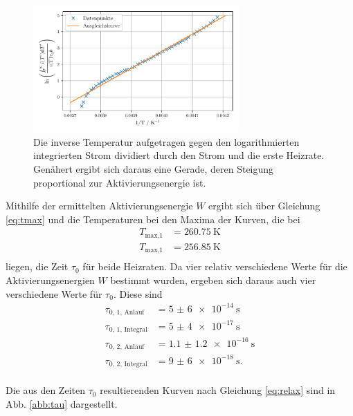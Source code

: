 \begin{figure}
    \centering
    \includegraphics[width=0.7\textwidth]{figures/integral2.pdf}
    \caption{Die inverse Temperatur aufgetragen gegen den logarithmierten integrierten Strom dividiert durch den Strom und die erste Heizrate. Genähert ergibt sich daraus eine Gerade, deren Steigung proportional zur Aktivierungsenergie ist.}
    \label{abb:integral2}
\end{figure}

Mithilfe der ermittelten Aktivierungsenergie $W$ ergibt sich über Gleichung \eqref{eq:tmax} und die Temperaturen bei den Maxima der Kurven, die bei 
\begin{align*}
    T_\text{max,1} &= \SI{260.75}{\kelvin} \\
    T_\text{max,1} &= \SI{256.85}{\kelvin} \\
\end{align*}
liegen, die Zeit $\tau_0$ für beide Heizraten. Da vier relativ verschiedene Werte für die Aktivierungsenergien $W$ bestimmt wurden, ergeben sich daraus auch vier verschiedene Werte für $\tau_0$.
Diese sind 
\begin{align*}
    \tau_\text{0, 1, Anlauf} &= \SI{5(6)e-14}{\second} \\
    \tau_\text{0, 1, Integral} &= \SI{5(4)e-17}{\second} \\
    \tau_\text{0, 2, Anlauf} &= \SI{1.1(12)e-16}{\second} \\
    \tau_\text{0, 2, Integral} &= \SI{9(6)e-18}{\second}. \\
\end{align*}

Die aus den Zeiten $\tau_0$ resultierenden Kurven nach Gleichung \eqref{eq:relax} sind in Abb. \ref{abb:tau} dargestellt.

